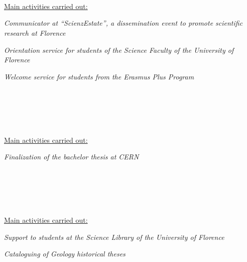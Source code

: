\begin{cvcontent}
  \\ [0.5mm]
  \\ [1.5mm]
  \\ [1.5mm]
  {\normalsize \color{maincolor} \ul{Main activities carried out:}\\ [1.5mm]
  \begin{itemize*}[label=\textcolor{iconcolor}{\textbullet}]
    \item \emph{Communicator at ``ScienzEstate'', a dissemination 
      event to promote scientific research at Florence}\\ [0.5mm]
    \item \emph{Orientation service for students of the Science 
      Faculty of the University of Florence}\\ [0.5mm]
    \item \emph{Welcome service for students from the Erasmus 
      Plus Program}
  \end{itemize*}}
  \\ [6mm]
  \\ [0.5mm]
  \\ [1.5mm]
  \\ [1.5mm]
  {\normalsize \color{maincolor} \ul{Main activities carried out:}\\ [1.5mm]
  \begin{itemize*}[label=\textcolor{iconcolor}{\textbullet}]
    \item \emph{Finalization of the bachelor thesis at CERN}
  \end{itemize*}}
  \\ [6mm]
  \\ [0.5mm]
  \\ [1.5mm]
  \\ [1.5mm]
  {\normalsize \color{maincolor} \ul{Main activities carried out:}\\ [1.5mm]
  \begin{itemize*}[label=\textcolor{iconcolor}{\textbullet}]
    \item \emph{Support to students at the Science Library 
                of the University of Florence}\\ [0.5mm]
    \item \emph{Cataloguing of Geology historical theses}
  \end{itemize*}}
\end{cvcontent}